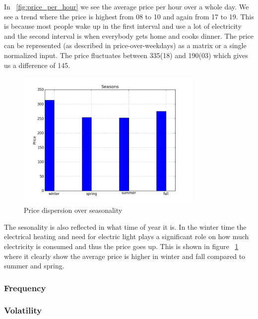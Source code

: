 In ~\ref{fig:price_per_hour} we see the average price per hour over a whole day. We see a trend where the price is highest from 08 to 10 and again from 17 to 19. This is because most people wake up in the first interval and use a lot of electricity and the second interval is when everybody gets home and cooks dinner. The price can be represented (as described in price-over-weekdays) as a matrix or a single normalized input. The price fluctuates between 335(18) and 190(03) which gives us a difference of 145.

\begin{figure}[H]
\centering
\includegraphics[width=0.8\textwidth ,natwidth=410,natheight=237]{billeder/energy_price_plots/seasons.png}
\caption{Price dispersion over seasonality}
\label{fig:seasons}
\end{figure}

The sesonality is also reflected in what time of year it is. In the winter time the electrical heating and need for electric light plays a significant role on how much electricity is consumed and thus the price goes up. This is shown in figure ~\ref{fig:seasons} where it clearly show the average price is higher in winter and fall compared to summer and spring.

\subsubsection{Frequency}

\subsubsection{Volatility}

